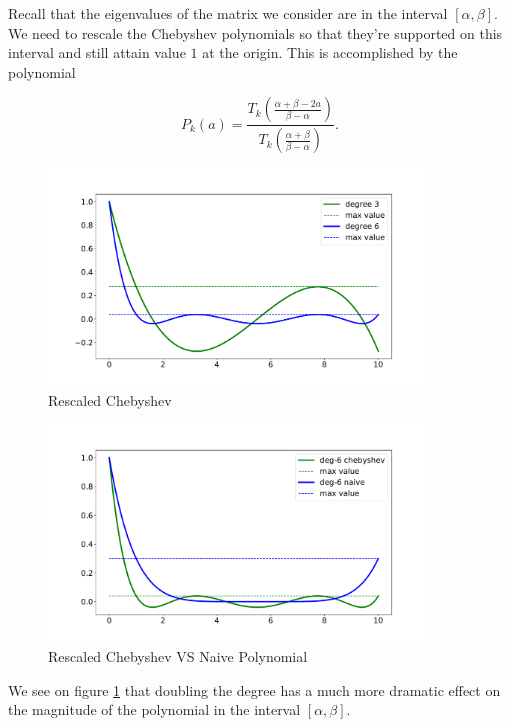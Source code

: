 Recall that the eigenvalues of the matrix we consider are in the interval $[\alpha, \beta]$. We need to rescale the Chebyshev polynomials so that they're supported on this interval and still attain value $1$ at the origin. This is accomplished by the polynomial

\begin{equation*}
P_k(a) = \frac{T_k\left(\frac{\alpha + \beta - 2a}{\beta - \alpha}\right)}{T_k\left(\frac{\alpha + \beta}{\beta - \alpha}\right)}.
\end{equation*}
\begin{figure}[ht]
\includegraphics[width=0.9\textwidth]{figures/lecture6-rescaled_cheb.pdf}
\centering
\caption{Rescaled Chebyshev}
\label{rescales_chebyshev}
\end{figure}

\begin{figure}[ht]
\includegraphics[width=0.9\textwidth]{figures/lecture6-rescaled_cheb_vs_naive.pdf}
\centering
\caption{Rescaled Chebyshev VS Naive Polynomial}
\label{rescaled_chebyshev_vs_naive_p}
\end{figure}

We see on figure \ref{rescales_chebyshev} that doubling the degree has a much more dramatic effect on the magnitude of the polynomial in the interval $[\alpha, \beta].$


